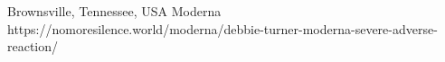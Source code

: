           {
            Brownsville, Tennessee, USA
          }
          {
          }
          {
            Moderna
          }
          {
          }
          {
          }
          {
            https://nomoresilence.world/moderna/debbie-turner-moderna-severe-adverse-reaction/
          }

